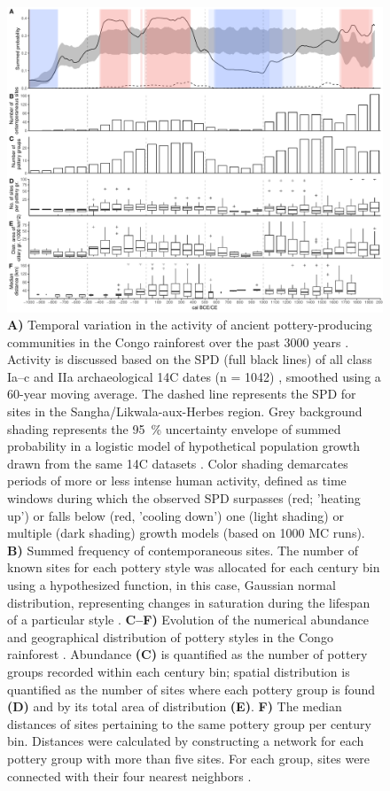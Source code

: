 \documentclass[smallextended,natbib]{svjour3}       %
\begin{document}
\begin{figure}[p]
	\centering
	\includegraphics[width=\textwidth]{Fig_SPD.pdf}
	\caption{\textbf{A)} Temporal variation in the activity of ancient pottery-producing communities in the Congo rainforest over the past 3000 years \citep[regions A--H in][Fig.~2]{Seidensticker.2021}. Activity is discussed based on the SPD (full black lines) of all class Ia--c and IIa archaeological 14C dates (n = 1042) \citep{Seidensticker.2021f}, smoothed using a 60-year moving average. The dashed line represents the SPD for sites in the Sangha/Likwala-aux-Herbes region. Grey background shading represents the 95~\% uncertainty envelope of summed probability in a logistic model of hypothetical population growth drawn from the same 14C datasets \citep{Bevan.2022}. Color shading demarcates periods of more or less intense human activity, defined as time windows during which the observed SPD surpasses (red; 'heating up') or falls below (red, 'cooling down') one (light shading) or multiple (dark shading) growth models (based on 1000 MC runs). \textbf{B)} Summed frequency of contemporaneous sites. The number of known sites for each pottery style was allocated for each century bin using a hypothesized function, in this case, Gaussian normal distribution, representing changes in saturation during the lifespan of a particular style \citep{Roberts.2012}. \textbf{C--F)} Evolution of the numerical abundance and geographical distribution of pottery styles in the Congo rainforest \citep[Fig.~3]{Seidensticker.2021}. Abundance \textbf{(C)} is quantified as the number of pottery groups recorded within each century bin; spatial distribution is quantified as the number of sites where each pottery group is found \textbf{(D)} and by its total area of distribution \textbf{(E)}. \textbf{F)} The median distances of sites pertaining to the same pottery group per century bin. Distances were calculated by constructing a network for each pottery group with more than five sites. For each group, sites were connected with their four nearest neighbors \citep{bivand2011spdep}.}
	\label{fig:spd}
\end{figure}
\end{document}
